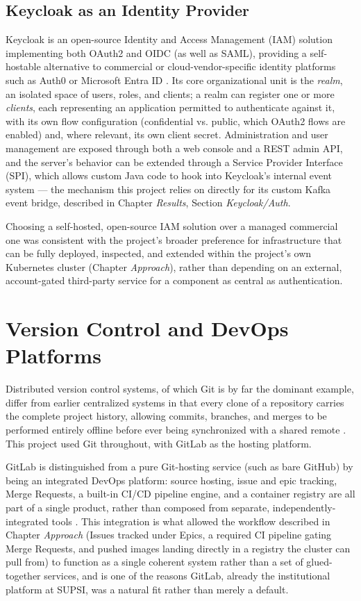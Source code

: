 \documentclass[twoside]{supsistudent}
\begin{document}
\subsection{Keycloak as an Identity Provider}
Keycloak is an open-source Identity and Access Management (IAM) solution implementing both OAuth2 and OIDC (as well as SAML), providing a self-hostable alternative to commercial or cloud-vendor-specific identity platforms such as Auth0 or Microsoft Entra ID \cite{keycloak}. Its core organizational unit is the \emph{realm}, an isolated space of users, roles, and clients; a realm can register one or more \emph{clients}, each representing an application permitted to authenticate against it, with its own flow configuration (confidential vs. public, which OAuth2 flows are enabled) and, where relevant, its own client secret. Administration and user management are exposed through both a web console and a REST admin API, and the server's behavior can be extended through a Service Provider Interface (SPI), which allows custom Java code to hook into Keycloak's internal event system — the mechanism this project relies on directly for its custom Kafka event bridge, described in Chapter \emph{Results}, Section \emph{Keycloak/Auth}.

Choosing a self-hosted, open-source IAM solution over a managed commercial one was consistent with the project's broader preference for infrastructure that can be fully deployed, inspected, and extended within the project's own Kubernetes cluster (Chapter \emph{Approach}), rather than depending on an external, account-gated third-party service for a component as central as authentication.

\section{Version Control and DevOps Platforms}
Distributed version control systems, of which Git is by far the dominant example, differ from earlier centralized systems in that every clone of a repository carries the complete project history, allowing commits, branches, and merges to be performed entirely offline before ever being synchronized with a shared remote \cite{chacon2014progit, git}. This project used Git throughout, with GitLab as the hosting platform.

GitLab is distinguished from a pure Git-hosting service (such as bare GitHub) by being an integrated DevOps platform: source hosting, issue and epic tracking, Merge Requests, a built-in CI/CD pipeline engine, and a container registry are all part of a single product, rather than composed from separate, independently-integrated tools \cite{chacon2014progit, gitlab}. This integration is what allowed the workflow described in Chapter \emph{Approach} (Issues tracked under Epics, a required CI pipeline gating Merge Requests, and pushed images landing directly in a registry the cluster can pull from) to function as a single coherent system rather than a set of glued-together services, and is one of the reasons GitLab, already the institutional platform at SUPSI, was a natural fit rather than merely a default.
\end{document}
